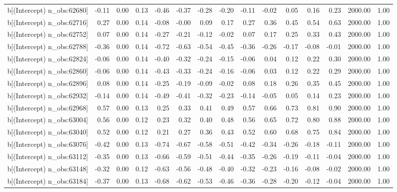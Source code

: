 \begin{table}[ht]
\begin{tabular}{rrrrrrrrrrrrrrr}
  b[(Intercept) n\_obs:62680] & -0.11 & 0.00 & 0.13 & -0.46 & -0.37 & -0.28 & -0.20 & -0.11 & -0.02 & 0.05 & 0.16 & 0.23 & 2000.00 & 1.00 \\ 
  b[(Intercept) n\_obs:62716] & 0.27 & 0.00 & 0.14 & -0.08 & -0.00 & 0.09 & 0.17 & 0.27 & 0.36 & 0.45 & 0.54 & 0.63 & 2000.00 & 1.00 \\ 
  b[(Intercept) n\_obs:62752] & 0.07 & 0.00 & 0.14 & -0.27 & -0.21 & -0.12 & -0.02 & 0.07 & 0.17 & 0.25 & 0.33 & 0.43 & 2000.00 & 1.00 \\ 
  b[(Intercept) n\_obs:62788] & -0.36 & 0.00 & 0.14 & -0.72 & -0.63 & -0.54 & -0.45 & -0.36 & -0.26 & -0.17 & -0.08 & -0.01 & 2000.00 & 1.00 \\ 
  b[(Intercept) n\_obs:62824] & -0.06 & 0.00 & 0.14 & -0.40 & -0.32 & -0.24 & -0.15 & -0.06 & 0.04 & 0.12 & 0.22 & 0.30 & 2000.00 & 1.00 \\ 
  b[(Intercept) n\_obs:62860] & -0.06 & 0.00 & 0.14 & -0.43 & -0.33 & -0.24 & -0.16 & -0.06 & 0.03 & 0.12 & 0.22 & 0.29 & 2000.00 & 1.00 \\ 
  b[(Intercept) n\_obs:62896] & 0.08 & 0.00 & 0.14 & -0.25 & -0.19 & -0.09 & -0.02 & 0.08 & 0.18 & 0.26 & 0.35 & 0.45 & 2000.00 & 1.00 \\ 
  b[(Intercept) n\_obs:62932] & -0.14 & 0.00 & 0.14 & -0.49 & -0.41 & -0.32 & -0.23 & -0.14 & -0.05 & 0.05 & 0.14 & 0.23 & 2000.00 & 1.00 \\ 
  b[(Intercept) n\_obs:62968] & 0.57 & 0.00 & 0.13 & 0.25 & 0.33 & 0.41 & 0.49 & 0.57 & 0.66 & 0.73 & 0.81 & 0.90 & 2000.00 & 1.00 \\ 
  b[(Intercept) n\_obs:63004] & 0.56 & 0.00 & 0.12 & 0.23 & 0.32 & 0.40 & 0.48 & 0.56 & 0.65 & 0.72 & 0.80 & 0.88 & 2000.00 & 1.00 \\ 
  b[(Intercept) n\_obs:63040] & 0.52 & 0.00 & 0.12 & 0.21 & 0.27 & 0.36 & 0.43 & 0.52 & 0.60 & 0.68 & 0.75 & 0.84 & 2000.00 & 1.00 \\ 
  b[(Intercept) n\_obs:63076] & -0.42 & 0.00 & 0.13 & -0.74 & -0.67 & -0.58 & -0.51 & -0.42 & -0.34 & -0.26 & -0.18 & -0.11 & 2000.00 & 1.00 \\ 
  b[(Intercept) n\_obs:63112] & -0.35 & 0.00 & 0.13 & -0.66 & -0.59 & -0.51 & -0.44 & -0.35 & -0.26 & -0.19 & -0.11 & -0.04 & 2000.00 & 1.00 \\ 
  b[(Intercept) n\_obs:63148] & -0.32 & 0.00 & 0.12 & -0.63 & -0.56 & -0.48 & -0.40 & -0.32 & -0.23 & -0.16 & -0.08 & -0.02 & 2000.00 & 1.00 \\ 
  b[(Intercept) n\_obs:63184] & -0.37 & 0.00 & 0.13 & -0.68 & -0.62 & -0.53 & -0.46 & -0.36 & -0.28 & -0.20 & -0.12 & -0.04 & 2000.00 & 1.00 \\ 

\end{tabular}
\end{table}
